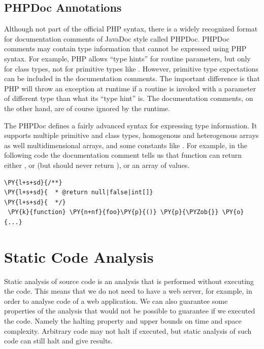     \subsection{PHPDoc Annotations}
    Although not part of the official PHP syntax, 
    there is a widely recognized format for documentation 
    comments of JavaDoc style called PHPDoc. PHPDoc comments 
    may contain type information that cannot be expressed using 
    PHP syntax. For example, PHP allows ``type hints'' 
    for routine parameters, but only for class types, 
    not for primitive types like . However, 
    primitive type expectations can be included in the 
    documentation comments. The important difference 
    is that PHP will throw an exception at runtime if 
    a routine is invoked with a parameter of different 
    type than what its ``type hint'' is. The documentation
    comments, on the other hand, are of course ignored 
    by the runtime.
    
    The PHPDoc defines a fairly advanced syntax for expressing 
    type information. It supports multiple 
    primitive and class types, homogenous and heterogenous arrays as well 
    multidimensional arrays, and some constants like .
    For example, in the following code the documentation 
    comment tells us that function  can return 
    either , or  (but should never 
    return ), or an array of  values.
    
\begin{Verbatim}[commandchars=\\\{\}]
 \PY{l+s+sd}{/**}
\PY{l+s+sd}{  * @return null|false|int[]}
\PY{l+s+sd}{  */}
 \PY{k}{function} \PY{n+nf}{foo}\PY{p}{()} \PY{p}{\PYZob{}} \PY{o}{...}
\end{Verbatim}
    
    \section{Static Code Analysis}       
        Static analysis of source code is an analysis that is performed without 
        executing the code. This means that we do not need to have a
        web server, for example, in order to analyse code of a web application. 
        We can also guarantee some properties of the analysis that would not 
        be possible to guarantee if we executed the code. Namely the halting property and 
        upper bounds on time and space complexity. Arbitrary code may not 
        halt if executed, but static analysis of such code can still halt 
        and give results.
        
